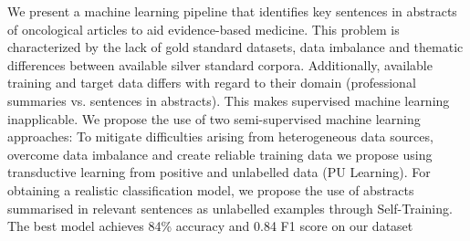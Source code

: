 We present a machine learning pipeline that identifies key sentences in abstracts of oncological articles to aid evidence-based medicine. This problem is characterized by the lack of gold standard datasets, data imbalance and thematic differences between available silver standard corpora. Additionally, available training and target data differs with regard to their domain (professional summaries vs. sentences in abstracts). This makes supervised machine learning inapplicable. We propose the use of two semi-supervised machine learning approaches: To mitigate difficulties arising from heterogeneous data sources, overcome data imbalance and create reliable training data we propose using transductive learning from positive and unlabelled data (PU Learning). For obtaining a realistic classification model, we propose the use of abstracts summarised in relevant sentences as unlabelled examples through Self-Training. The best model achieves 84\% accuracy and 0.84 F1 score on our dataset
